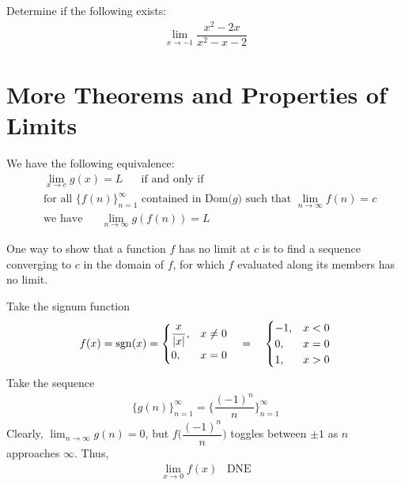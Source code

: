 \begin{exercise}
Determine if the following exists:
\begin{align*}
\lim_{x \longrightarrow -1} \dfrac{x^{2}-2x}{x^{2}-x-2}
\end{align*}
\end{exercise}



\newpage
\section{More Theorems and Properties of Limits}

\begin{theorem}
We have the following equivalence:
\begin{align*}
    &\lim_{x \longrightarrow c} g(x) = L \hspace{20pt} \text{if and only if}\\[2ex]
    &\text{for all} \hspace{4pt} \{f(n)\}_{n=1}^{\infty} \hspace{4pt} \text{contained in Dom($g$) such that} \hspace{4pt} \lim_{n \longrightarrow \infty} f(n)=c\\[2ex]
    &\text{we have} \hspace{20pt} \lim_{n \longrightarrow \infty} g(f(n)) = L
\end{align*}
\label{sequential_criterion_for_limits}
\end{theorem}

\begin{note}
One way to show that a function $f$ has no limit at $c$ is to find a sequence converging to $c$ in the domain of $f$, for which $f$ evaluated along its members has no limit. 
\end{note}

\begin{example}
Take the signum function
\begin{align*}
    f(x) = \operatorname{sgn}(x) = \begin{cases}
    \dfrac{x}{\lvert x \rvert}, & x \neq 0\\
    0, & x = 0
    \end{cases} \hspace{10pt} = \hspace{10pt} \begin{cases}
    -1, & x<0\\
    0, & x=0\\
    1, & x>0
    \end{cases}
\end{align*}
Take the sequence
\begin{align*}
    \{g(n)\}_{n=1}^{\infty} = \Big\{\dfrac{(-1)^{n}}{n}\Big\}_{n=1}^{\infty}
\end{align*}
Clearly, $\lim_{n \longrightarrow \infty} g(n) = 0$, but $f\Big(\dfrac{(-1)^{n}}{n}\Big)$ toggles between $\pm 1$ as $n$ approaches $\infty$. Thus,
\begin{align*}
    \lim_{x \longrightarrow 0} f(x) \hspace{10pt} \text{DNE}
\end{align*}
\end{example}

